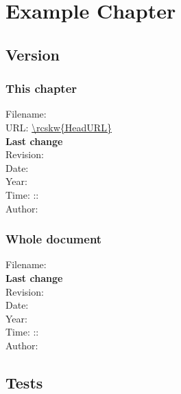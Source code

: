 
\chapter{Example Chapter}

\section{Version}
\subsection*{This chapter}
Filename: \\
URL: \url{\rcskw{HeadURL}}\\
\textbf{Last change}\\
Revision: \rcsfilerev\\
Date: \rcsfiledate\\
Year: \rcsfileyear\\
Time: \rcsfilehour:\rcsfileminute:\rcsfilesecond\\
Author: \rcsfileauthor\\

\subsection*{Whole document}
Filename: \rcsnolinkurl{\rcsmainfilename}\\
\textbf{Last change}\\
Revision: \rcsrev\\
Date: \rcsdate\\
Year: \rcsyear\\
Time: \rcshour:\rcsminute:\rcssecond\\
Author: \rcsauthor\\

\section{Tests}

